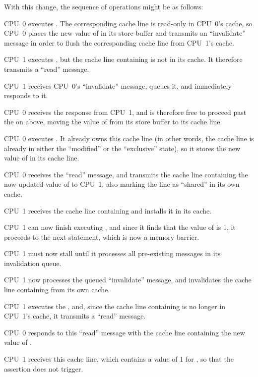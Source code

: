 \begin{fcvref}
With this change, the sequence of operations might be as follows:
\begin{sequence}
\item	CPU~0 executes .  The corresponding
	cache line is read-only in
	CPU~0's cache, so CPU~0 places the new value of  in its
	store buffer and transmits an ``invalidate'' message in order
	to flush the corresponding cache line from CPU~1's cache.
\item	CPU~1 executes , but the cache line
	containing  is not in its cache.
	It therefore transmits a ``read'' message.
\item	CPU~1 receives CPU~0's ``invalidate'' message, queues it, and
	immediately responds to it.
\item	CPU~0 receives the response from CPU~1, and is therefore free
	to proceed past the  on  above, moving
	the value of  from its store buffer to its cache line.
\item	CPU~0 executes .
	It already owns this cache line (in other words, the cache line
	is already in either the ``modified'' or the ``exclusive'' state),
	so it stores the new value of  in its cache line.
\item	CPU~0 receives the ``read'' message, and transmits the
	cache line containing the now-updated value of 
	to CPU~1, also marking the line as ``shared'' in its own cache.
\item	CPU~1 receives the cache line containing  and installs
	it in its cache.
\item	CPU~1 can now finish executing ,
	and since it finds that the value of  is 1, it proceeds
	to the next statement, which is now a memory barrier.
\item	CPU~1 must now stall until it processes all pre-existing
	messages in its invalidation queue.
\item	CPU~1 now processes the queued
	``invalidate'' message, and
	invalidates the cache line containing  from its own cache.
\item	CPU~1 executes the , and, since the
	cache line containing  is no longer in CPU~1's cache,
	it transmits a ``read'' message.
\item	CPU~0 responds to this ``read'' message with the cache line
	containing the new value of .
\item	CPU~1 receives this cache line, which contains a value of 1 for
	, so that the assertion does not trigger.
\end{sequence}
\end{fcvref}

